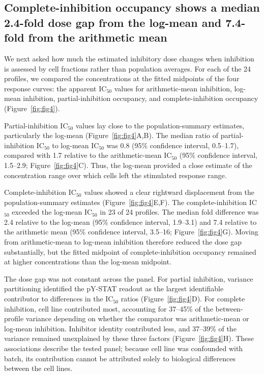 \documentclass[11pt]{article}
\newcommand{\icfifty}{IC$_{50}$}
\begin{document}
\subsection*{Complete-inhibition occupancy shows a median 2.4-fold dose gap from the log-mean and 7.4-fold from the arithmetic mean}

We next asked how much the estimated inhibitory dose changes when inhibition is assessed by cell fractions rather than population averages. For each of the 24 profiles, we compared the concentrations at the fitted midpoints of the four response curves: the apparent \icfifty{} values for arithmetic-mean inhibition, log-mean inhibition, partial-inhibition occupancy, and complete-inhibition occupancy (Figure~\ref{fig:fig4}).

Partial-inhibition \icfifty{} values lay close to the population-summary estimates, particularly the log-mean (Figure~\ref{fig:fig4}A,B). The median ratio of partial-inhibition \icfifty{} to log-mean \icfifty{} was 0.8 (95\% confidence interval, 0.5--1.7), compared with 1.7 relative to the arithmetic-mean \icfifty{} (95\% confidence interval, 1.5--2.9; Figure~\ref{fig:fig4}C). Thus, the log-mean provided a close estimate of the concentration range over which cells left the stimulated response range.

Complete-inhibition \icfifty{} values showed a clear rightward displacement from the population-summary estimates (Figure~\ref{fig:fig4}E,F). The complete-inhibition \icfifty{} exceeded the log-mean \icfifty{} in 23 of 24 profiles. The median fold difference was 2.4 relative to the log-mean (95\% confidence interval, 1.9--3.1) and 7.4 relative to the arithmetic mean (95\% confidence interval, 3.5--16; Figure~\ref{fig:fig4}G). Moving from arithmetic-mean to log-mean inhibition therefore reduced the dose gap substantially, but the fitted midpoint of complete-inhibition occupancy remained at higher concentrations than the log-mean midpoint.

The dose gap was not constant across the panel. For partial inhibition, variance partitioning identified the pY-STAT readout as the largest identifiable contributor to differences in the \icfifty{} ratios (Figure~\ref{fig:fig4}D). For complete inhibition, cell line contributed most, accounting for 37--45\% of the between-profile variance depending on whether the comparator was arithmetic-mean or log-mean inhibition. Inhibitor identity contributed less, and 37--39\% of the variance remained unexplained by these three factors (Figure~\ref{fig:fig4}H). These associations describe the tested panel; because cell line was confounded with batch, its contribution cannot be attributed solely to biological differences between the cell lines.
\end{document}
